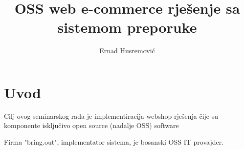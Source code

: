 \documentclass[times, utf8, seminar]{fit}
\begin{document}





\title{OSS web e-commerce rješenje sa sistemom preporuke}

\author{Ernad Husremović}


\maketitle

\tableofcontents

\newpage

%
%


\chapter{Uvod}
\vspace*{-0.7cm}

Cilj ovog seminarskog rada je implementiracija webshop rješenja čije su komponente isključivo open source (nadalje OSS) software 

Firma "bring.out", implementator sistema, je bosanski OSS IT provajder.
\end{document}
